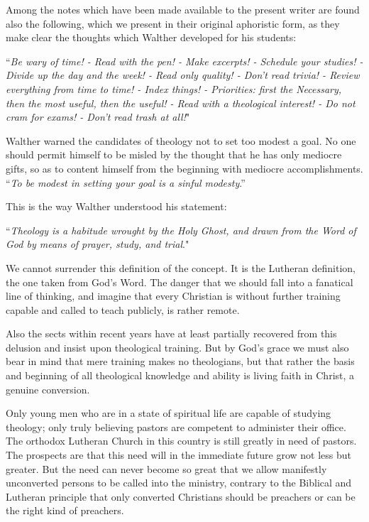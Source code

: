 Among the notes which have been made available to the present writer are found also the following, which we present in their original aphoristic form, as they make clear the thoughts which Walther developed for his students: \begin{displayquote}``\textit{Be wary of time! - Read with the pen! - Make excerpts! - Schedule your studies! - Divide up the day and the week! - Read only quality! - Don't read trivia! - Review everything from time to time! - Index things! - Priorities: first the Necessary, then the most useful, then the useful! - Read with a theological interest! - Do not cram for exams! - Don't read trash at all!}"\end{displayquote} Walther warned the candidates of theology not to set too modest a goal. No one should permit himself to be misled by the thought that he has only mediocre gifts, so as to content himself from the beginning with mediocre accomplishments. ``\textit{To be modest in setting your goal is a sinful modesty}.''

This is the way Walther understood his statement: \begin{displayquote}``\textit{Theology is a habitude wrought by the Holy Ghost, and drawn from the Word of God by means of prayer, study, and trial}."\end{displayquote} We cannot surrender this definition of the concept. It is the Lutheran definition, the one taken from God's Word. The danger that we should fall into a fanatical line of thinking, and imagine that every Christian is without further training capable and called to teach publicly, is rather remote.

Also the sects within recent years have at least partially recovered from this delusion and insist upon theological training. But by God's grace we must also bear in mind that mere training makes no theologians, but that rather the basis and beginning of all theological knowledge and ability is living faith in Christ, a genuine conversion.

Only young men who are in a state of spiritual life are capable of studying theology; only truly believing pastors are competent to administer their office. The orthodox Lutheran Church in this country is still greatly in need of pastors. The prospects are that this need will in the immediate future grow not less but greater. But the need can never become so great that we allow manifestly unconverted persons to be called into the ministry, contrary to the Biblical and Lutheran principle that only converted Christians should be preachers or can be the right kind of preachers.

